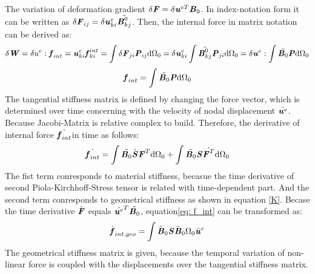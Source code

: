 The variation of deformation gradient $\delta \textbf{\textit{F}} = \delta \textbf{\textit{u}}^{eT} \textbf{\textit{B}}_0$. In index-notation form it can be written as $\delta \textbf{\textit{F}}_{ij} = \delta \textbf{\textit{u}}_{ki}^e \tilde{\textbf{\textit{B}}_{kj}^0}$. Then, the internal force in matrix notation can be derived as:
\begin{equation}
\delta \textbf{\textit{W}} = \delta u^e : \textbf{\textit{f}}_{int} = \textbf{\textit{u}}_{ki}^e \textbf{\textit{f}}_{ki}^{int} = \int \delta \textbf{\textit{F}}_{ji} \textbf{\textit{P}}_{ij} \mathrm{d}\Omega_0 = \delta \textbf{\textit{u}}_{ki}^e \int \tilde{\textbf{\textit{B}}_{kj}^0} \textbf{\textit{P}}_{ji}\mathrm{d}\Omega_0 = \delta \textbf{\textit{u}}^e : \int \tilde{\textbf{\textit{B}}_0} \textbf{\textit{P}} \mathrm{d}\Omega_0
\end{equation}
\begin{equation}
\textbf{\textit{f}}_{int} = \int \tilde{\textbf{\textit{B}}_0} \textbf{\textit{P}} \mathrm{d}\Omega_0
\end{equation}
The tangential stiffness matrix is defined by changing the force vector, which is determined over time concerning with the velocity of nodal displacement $\dot{\textbf{\textit{u}}^e}$. Because Jacobi-Matrix is relative complex to build. Therefore, the derivative of internal force $\dot{\textbf{\textit{f}}_{int}}$in time as follows:
\begin{equation} \label{eq: f_int}
\dot{\textbf{\textit{f}}_{int}} = \int \tilde{\textbf{\textit{B}}_0} \dot{\textbf{\textit{S}}} \textbf{\textit{F}}^T \mathrm{d}\Omega_0 + \int \tilde{\textbf{\textit{B}}_0} \textbf{\textit{S}} \dot{\textbf{\textit{F}}^T} \mathrm{d}\Omega_0
\end{equation}
The fist term conresponds to material stiffness, becasue the time derivative of second Piola-Kirchhoff-Stress tensor is related with time-dependent part. And the second term conresponds to geometrical stiffness as shown in equation \ref{K}. Becase the time derivative $\dot {\textbf{\textit{F}}}$ equals $\dot{\textbf{\textit{u}}^e}^T \tilde{\textbf{\textit{B}}_0}$, equation\ref{eq: f_int} can be transformed as:
\begin{equation}
\dot{\textbf{\textit{f}}}_{int,geo} = \int \tilde{\textbf{\textit{B}}}_0 \textbf{\textit{S}} \tilde{\textbf{\textit{B}}}_0 \mathrm{\Omega_0} \dot{\textbf{\textit{u}}}^e
\end{equation}
The geometrical stiffness matrix is given, because the temporal variation of non-linear force is coupled with the displacements over the tangential stiffness matrix.
